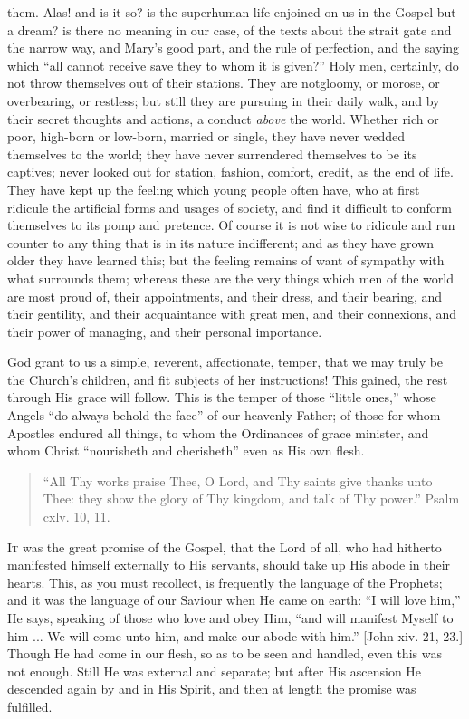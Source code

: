 them. Alas! and is it so? is the superhuman life enjoined on us in the
Gospel but a dream? is there no meaning in our case, of the texts
about the strait gate and the narrow way, and Mary's good part, and
the rule of perfection, and the saying which ``all cannot receive
save they to whom it is given?'' Holy men, certainly, do not throw
themselves out of their stations. They are not\emph{}gloomy, or
morose, or overbearing, or restless; but still they are pursuing in
their daily walk, and by their secret thoughts and actions, a conduct \emph{above}
the world. Whether rich or poor, high-born or low-born, married or
single, they have never wedded themselves to the world; they have
never surrendered themselves to be its captives; never looked out for
station, fashion, comfort, credit, as the end of life. They have kept
up the feeling which young people often have, who at first ridicule
the artificial forms and usages of society, and find it difficult to
conform themselves to its pomp and pretence. Of course it is not wise
to ridicule and run counter to any thing that is in its nature
indifferent; and as they have grown older they have learned this; but
the feeling remains of want of sympathy with what surrounds them;
whereas these are the very things which men of the world are most
proud of, their appointments, and their dress, and their bearing, and
their gentility, and their acquaintance with great men, and their
connexions, and their power of managing, and their personal
importance.

God grant to us a simple, reverent, affectionate, temper, that we
may truly be the Church's children, and fit subjects of her
instructions! This gained, the rest through His grace will follow.
This is the temper of those ``little ones,'' whose Angels
``do always behold the face'' of our heavenly Father; of those
for whom Apostles endured all things, to whom the Ordinances of grace
minister, and whom Christ ``nourisheth and cherisheth'' even
as His own flesh.


\begin{quote}

``All Thy works praise Thee, O Lord, and Thy saints give
thanks unto Thee: they show the glory of Thy kingdom, and talk of
Thy power.'' Psalm cxlv. 10, 11.

\end{quote}

I\textsc{t} was the great promise of the Gospel, that the Lord of all, who
had hitherto manifested himself externally to His servants, should
take up His abode in their hearts. This, as you must recollect, is
frequently the language of the Prophets; and it was the language of
our Saviour when He came on earth: ``I will love him,'' He
says, speaking of those who love and obey Him, ``and will manifest
Myself to him ... We will come unto him, and make our abode with
him.'' [John xiv. 21, 23.] Though He had come in our flesh, so as
to be seen and handled, even this was not enough. Still He was
external and separate; but after His ascension He descended again by
and in His Spirit, and then at length the promise was fulfilled.

